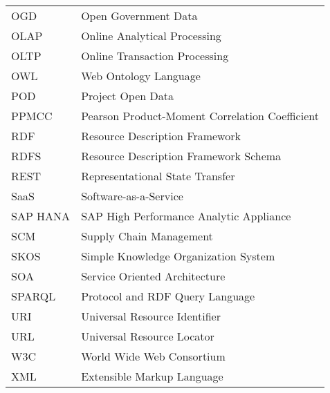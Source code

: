 \begin{longtable}{lp{9cm}}
 OGD & Open Government Data\\
 OLAP & Online Analytical Processing \\
 OLTP & Online Transaction Processing \\
 OWL &  Web Ontology Language \\
 POD & Project Open Data \\
 PPMCC & Pearson Product-Moment Correlation Coefficient \\
 RDF  & Resource Description Framework\\
 RDFS & Resource Description Framework Schema \\
 REST & Representational State Transfer\\
 SaaS & Software-as-a-Service \\
 SAP HANA & SAP High Performance Analytic Appliance \\
 SCM & Supply Chain Management\\
 SKOS &  Simple Knowledge Organization System \\
 SOA & Service Oriented Architecture\\
 SPARQL & Protocol and RDF Query Language \\
 URI & Universal Resource Identifier \\
 URL & Universal Resource Locator \\
 W3C & World Wide Web Consortium \\
 XML & Extensible Markup Language
\end{longtable}

